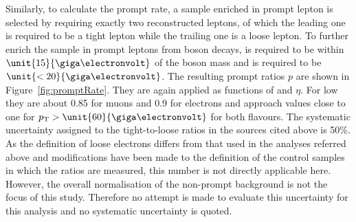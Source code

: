 Similarly, to calculate the prompt rate, a sample enriched in prompt lepton is selected by requiring exactly two reconstructed leptons, of which the leading one is required to be a tight lepton while the trailing one is a loose lepton. To further enrich the sample in prompt leptons from \Z boson decays, \mll is required to be within $\unit{15}{\giga\electronvolt}$ of the \Z boson mass and \MET is required to be $\unit{<20}{\giga\electronvolt}$. The resulting prompt ratios $p$ are shown in Figure~\ref{fig:promptRate}. They are again applied as functions of \pt and $\eta$. For low \pt they are about 0.85 for muons and 0.9 for electrons and approach values close to one for $\pt > \unit{60}{\giga\electronvolt}$ for both flavours. The systematic uncertainty assigned to the tight-to-loose ratios in the sources cited above is 50\%. As the definition of loose electrons differs from that used in the analyses referred above and modifications have been made to the definition of the control samples in which the ratios are measured, this number is not directly applicable here. However, the overall normalisation of the non-prompt background is not the focus of this study. Therefore no attempt is made to evaluate this uncertainty for this analysis and no systematic uncertainty is quoted. 

